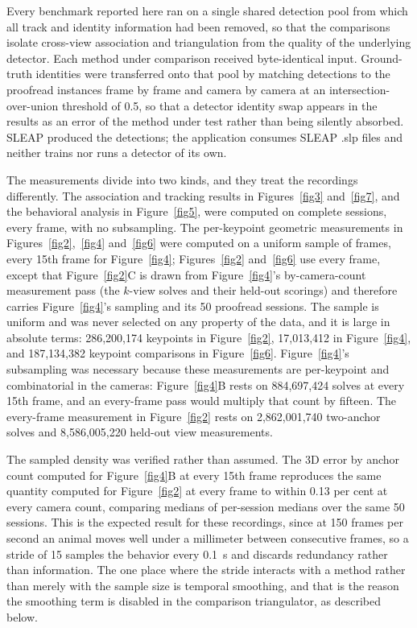 \documentclass[pdflatex, sn-nature]{sn-jnl}
\theoremstyle{thmstyleone}%
\theoremstyle{thmstyletwo}%
\theoremstyle{thmstylethree}%
\begin{document}
Every benchmark reported here ran on a single shared detection pool from which all track and identity information had been removed, so that the comparisons isolate cross-view association and triangulation from the quality of the underlying detector. Each method under comparison received byte-identical input. Ground-truth identities were transferred onto that pool by matching detections to the proofread instances frame by frame and camera by camera at an intersection-over-union threshold of 0.5, so that a detector identity swap appears in the results as an error of the method under test rather than being silently absorbed. SLEAP produced the detections; the application consumes SLEAP .slp files and neither trains nor runs a detector of its own.

The measurements divide into two kinds, and they treat the recordings differently. The association and tracking results in Figures~\ref{fig3} and~\ref{fig7}, and the behavioral analysis in Figure~\ref{fig5}, were computed on complete sessions, every frame, with no subsampling. The per-keypoint geometric measurements in Figures~\ref{fig2},~\ref{fig4} and~\ref{fig6} were computed on a uniform sample of frames, every 15th frame for Figure~\ref{fig4}; Figures~\ref{fig2} and~\ref{fig6} use every frame, except that Figure~\ref{fig2}C is drawn from Figure~\ref{fig4}'s by-camera-count measurement pass (the $k$-view solves and their held-out scorings) and therefore carries Figure~\ref{fig4}'s sampling and its 50 proofread sessions. The sample is uniform and was never selected on any property of the data, and it is large in absolute terms: 286,200,174 keypoints in Figure~\ref{fig2}, 17,013,412 in Figure~\ref{fig4}, and 187,134,382 keypoint comparisons in Figure~\ref{fig6}. Figure~\ref{fig4}'s subsampling was necessary because these measurements are per-keypoint and combinatorial in the cameras: Figure~\ref{fig4}B rests on 884,697,424 solves at every 15th frame, and an every-frame pass would multiply that count by fifteen. The every-frame measurement in Figure~\ref{fig2} rests on 2,862,001,740 two-anchor solves and 8,586,005,220 held-out view measurements.

The sampled density was verified rather than assumed. The 3D error by anchor count computed for Figure~\ref{fig4}B at every 15th frame reproduces the same quantity computed for Figure~\ref{fig2} at every frame to within 0.13 per cent at every camera count, comparing medians of per-session medians over the same 50 sessions. This is the expected result for these recordings, since at 150 frames per second an animal moves well under a millimeter between consecutive frames, so a stride of 15 samples the behavior every 0.1~s and discards redundancy rather than information. The one place where the stride interacts with a method rather than merely with the sample size is temporal smoothing, and that is the reason the smoothing term is disabled in the comparison triangulator, as described below.
\end{document}

